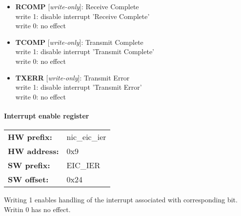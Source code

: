 \begin{itemize}
\item \begin{small}
{\bf 
RCOMP
} [\emph{write-only}]: Receive Complete
\\
write 1: disable interrupt 'Receive Complete'\\write 0: no effect
\end{small}
\item \begin{small}
{\bf 
TCOMP
} [\emph{write-only}]: Transmit Complete
\\
write 1: disable interrupt 'Transmit Complete'\\write 0: no effect
\end{small}
\item \begin{small}
{\bf 
TXERR
} [\emph{write-only}]: Transmit Error
\\
write 1: disable interrupt 'Transmit Error'\\write 0: no effect
\end{small}
\end{itemize}
\paragraph*{Interrupt enable register}\vspace{12pt}

\begin{tabular}{l l }
{\bf HW prefix:}  & nic\_eic\_ier\\
{\bf HW address:}  & 0x9\\
{\bf SW prefix:}  & EIC\_IER\\
{\bf SW offset:}  & 0x24\\
\end{tabular}

\vspace{12pt}
Writing 1 enables handling of the interrupt associated with corresponding bit. Writin 0 has no effect.

